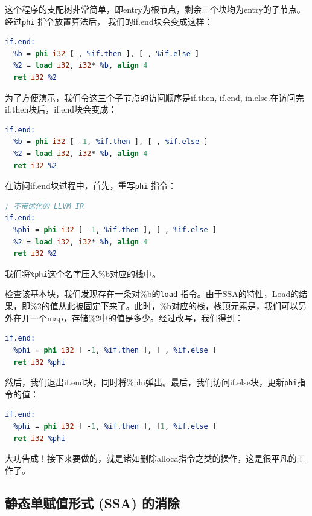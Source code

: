 这个程序的支配树非常简单，即entry为根节点，剩余三个块均为entry的子节点。
经过\texttt{phi} 指令放置算法后， 我们的if.end块会变成这样：

\begin{lstlisting}[language=LLVM]
if.end:
  %b = phi i32 [ , %if.then ], [ , %if.else ]
  %2 = load i32, i32* %b, align 4
  ret i32 %2
\end{lstlisting}

为了方便演示，我们令这三个子节点的访问顺序是if.then, if.end, in.else.在访问完if.then块后，if.end块会变成：

\begin{lstlisting}[language=LLVM]
if.end:
  %b = phi i32 [ -1, %if.then ], [ , %if.else ]
  %2 = load i32, i32* %b, align 4
  ret i32 %2
\end{lstlisting}

在访问if.end块过程中，首先，重写\texttt{phi} 指令：

\begin{lstlisting}[language=LLVM]
; 不带优化的 LLVM IR
if.end:
  %phi = phi i32 [ -1, %if.then ], [ , %if.else ]
  %2 = load i32, i32* %b, align 4
  ret i32 %2
\end{lstlisting}

我们将\texttt{\%phi}这个名字压入\%b对应的栈中。 

检查该基本块，我们发现存在一条对\%b的\texttt{load} 指令。由于SSA的特性，Load的结果，即\%2的值从此被固定下来了。此时，\%b对应的栈，栈顶元素是，我们可以另外在开一个map，存储\%2中的值是多少。经过改写，我们得到：

\begin{lstlisting}[language=LLVM]
if.end:
  %phi = phi i32 [ -1, %if.then ], [ , %if.else ]
  ret i32 %phi
\end{lstlisting}

然后，我们退出if.end块，同时将\%phi弹出。最后，我们访问if.else块，更新\texttt{phi}指令的值：

\begin{lstlisting}[language=LLVM]
if.end:
  %phi = phi i32 [ -1, %if.then ], [1, %if.else ]
  ret i32 %phi
\end{lstlisting}

大功告成！接下来要做的，就是诸如删除alloca指令之类的操作，这是很平凡的工作了。

\subsection{静态单赋值形式 (SSA) 的消除} \label{SSA-eliminate-phi}

